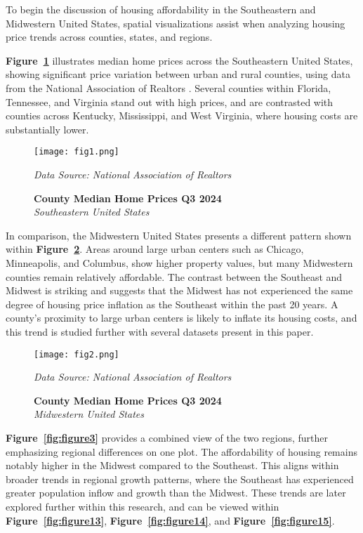 \documentclass[journal,article,submit,pdftex,moreauthors]{Definitions/mdpi}
\begin{document}
To begin the discussion of housing affordability in the Southeastern and Midwestern United States, spatial visualizations assist when analyzing housing price trends across counties, states, and regions. 

\textbf{Figure~\ref{fig:figure1}} illustrates median home prices across the Southeastern United States, showing significant price variation between urban and rural counties, using data from the National Association of Realtors \citep{_2024_county}. Several counties within Florida, Tennessee, and Virginia stand out with high prices, and are contrasted with counties across Kentucky, Mississippi, and West Virginia, where housing costs are substantially lower.

\begin{figure}[H]
  \centering
  \texttt{[image: fig1.png]}
  \caption{\textbf{County Median Home Prices Q3 2024}\\\textit{Southeastern United States}}
  \label{fig:figure1}
  \vspace{1ex}
  {\footnotesize\textit{Data Source: National Association of Realtors}}
\end{figure}
        	
In comparison, the Midwestern United States presents a different pattern shown within \textbf{Figure~\ref{fig:figure2}}. Areas around large urban centers such as Chicago, Minneapolis, and Columbus, show higher property values, but many Midwestern counties remain relatively affordable. The contrast between the Southeast and Midwest is striking and suggests that the Midwest has not experienced the same degree of housing price inflation as the Southeast within the past 20 years. A county’s proximity to large urban centers is likely to inflate its housing costs, and this trend is studied further with several datasets present in this paper.  

\begin{figure}[H]
  \centering
  \texttt{[image: fig2.png]}
  \caption{\textbf{County Median Home Prices Q3 2024}\\\textit{Midwestern United States}}
  \label{fig:figure2}
  \vspace{1ex}
  {\footnotesize\textit{Data Source: National Association of Realtors}}
\end{figure}

\textbf{Figure~\ref{fig:figure3}} provides a combined view of the two regions, further emphasizing regional differences on one plot. The affordability of housing remains notably higher in the Midwest compared to the Southeast. This aligns within broader trends in regional growth patterns, where the Southeast has experienced greater population inflow and growth than the Midwest. These trends are later explored further within this research, and can be viewed within \textbf{Figure~\ref{fig:figure13}}, \textbf{Figure~\ref{fig:figure14}}, and \textbf{Figure~\ref{fig:figure15}}.
\end{document}
